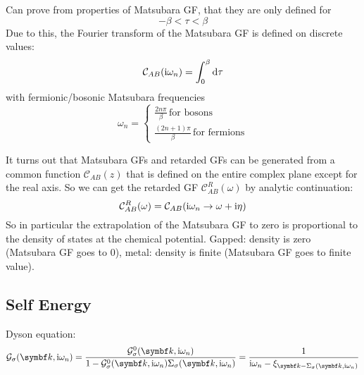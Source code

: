 \documentclass[../notes.tex]{subfiles}
\begin{document}
Can prove from properties of Matsubara GF, that they are only defined for
\begin{equation}
	-\beta < \tau < \beta
\end{equation}
Due to this, the Fourier transform of the Matsubara GF is defined on discrete values:
\begin{equation}
	\mathcal{C}_{A B} (\iu \omega_n) = \int_{0}^{\beta} \odif{\tau}
\end{equation}
with fermionic/bosonic Matsubara frequencies
\begin{equation}
	\omega_n =
	\begin{cases}
		\frac{2n \pi}{\beta} \, \text{for bosons} \\
		\frac{(2n + 1)\pi}{\beta} \, \text{for fermions}
	\end{cases}
\end{equation}

It turns out that Matsubara GFs and retarded GFs can be generated from a common function \(\mathcal{C}_{AB} (z)\) that is defined on the entire complex plane except for the real axis.
So we can get the retarded GF \(\mathcal{C}_{AB}^R (\omega)\) by analytic continuation:
\begin{equation}
	\mathcal{C}_{AB}^R (\omega) = \mathcal{C}_{AB} (\mathrm{i} \omega_n \to \omega + \mathrm{i} \eta)
\end{equation}
So in particular the extrapolation of the Matsubara GF to zero is proportional to the density of states at the chemical potential.
Gapped: density is zero (Matsubara GF goes to 0), metal: density is finite (Matsubara GF goes to finite value).


\subsection{Self Energy}




Dyson equation:
\begin{equation}
	\mathcal{G}_{\sigma} (\vb{k}, \iu \omega_n) = \frac{\mathcal{G}_{\sigma}^0 (\vb{k}, \iu \omega_n)}{1 - \mathcal{G}_{\sigma}^0 (\vb{k}, \iu \omega_n) \Sigma_{\sigma} (\vb{k}, \iu \omega_n)} = \frac{1}{\iu \omega_n - \xi_{\vb{k} - \Sigma_{\sigma} (\vb{k}, \iu \omega_n)}}
\end{equation}
\end{document}
